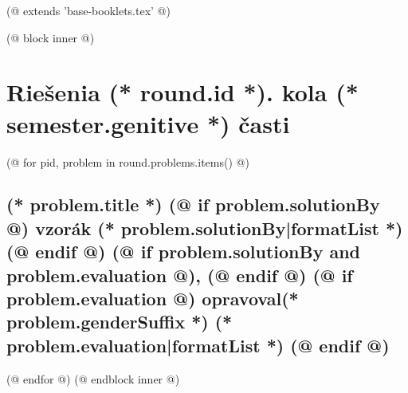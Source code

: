 (@ extends 'base-booklets.tex' @)
 
(@ block inner @)
    \pagestyle{seminar-solutions-(* competition.id *)-(* volume.id *)-(* semester.id *)-(* round.id *)}

    \section{\texorpdfstring{Riešenia (* round.id *). kola (* semester.genitive *) časti}{Riešenia}}
        
    (@ for pid, problem in round.problems.items() @)%
        \setcounter{volume}{(* volume.number *)}%
        \setcounter{semester}{(* semester.number *)}%
        \setcounter{round}{(* round.number *)}%
        \setcounter{problem}{(* problem.number *)}%

        \subsection{%
            \texorpdfstring{%
                \large \textbf{(* problem.title *)} \hfill \normalsize%
                (@ if problem.solutionBy @)%
                    vzorák (* problem.solutionBy|formatList *)%
                (@ endif @)%
                (@ if problem.solutionBy and problem.evaluation @), (@ endif @)%
                (@ if problem.evaluation @)%
                    opravoval(* problem.genderSuffix *) (* problem.evaluation|formatList *)%
                (@ endif @)%
            }{(* round.number *).(* problem.number *) (* problem.title *)}%
        }

    (@ endfor @)
(@ endblock inner @)
